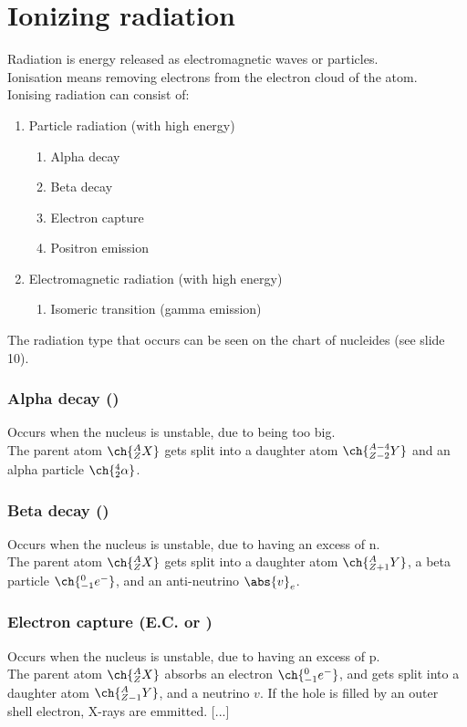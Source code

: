 \section{Ionizing radiation}
Radiation is energy released as electromagnetic waves or particles. \\
Ionisation means removing electrons from the electron cloud of the atom. \\
Ionising radiation can consist of:
 \begin{enumerate}
	\item Particle radiation (with high energy)
	 \begin{enumerate}
		\item Alpha decay
		\item Beta decay
		\item Electron capture
		\item Positron emission
	\end{enumerate}
	 \item Electromagnetic radiation (with high energy)
	 \begin{enumerate}
		\item Isomeric transition (gamma emission)
	\end{enumerate}	 
\end{enumerate}
The radiation type that occurs can be seen on the chart of nucleides (see slide 10). 
\subsubsection{Alpha decay (\alpha)}
Occurs when the nucleus is unstable, due to being too big.\\
The parent atom $\ch{^{A}_{Z}X}$ gets split into a daughter atom $\ch{^{A-4}_{Z-2}Y}$ and an alpha particle $\ch{^{4}_{2}\alpha}$.
\subsubsection{Beta decay (\beta)}
Occurs when the nucleus is unstable, due to having an excess of n.\\
The parent atom $\ch{^{A}_{Z}X}$ gets split into a daughter atom $\ch{^{A}_{Z+1}Y}$, a beta particle $\ch{^{0}_{-1}e^{-}}$, and an anti-neutrino $\abs{v}_e$.
\subsubsection{Electron capture (E.C. or \epsilon)}
Occurs when the nucleus is unstable, due to having an excess of p.\\
The parent atom $\ch{^{A}_{Z}X}$ absorbs an electron $\ch{^{0}_{-1}e^{-}}$, and gets split into a daughter atom $\ch{^{A}_{Z-1}Y}$, and a neutrino $v$.
If the hole is filled by an outer shell electron, X-rays are emmitted.
[...]
